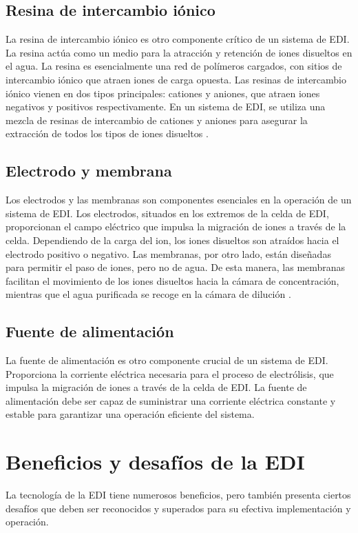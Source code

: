\subsection{Resina de intercambio iónico}
La resina de intercambio iónico es otro componente crítico de un sistema de EDI. La resina actúa como un medio para la
atracción y retención de iones disueltos en el agua. La resina es esencialmente una red de polímeros cargados, con sitios
de intercambio iónico que atraen iones de carga opuesta. Las resinas de intercambio iónico vienen en dos tipos principales:
cationes y aniones, que atraen iones negativos y positivos respectivamente. En un sistema de EDI, se utiliza una mezcla de
resinas de intercambio de cationes y aniones para asegurar la extracción de todos los tipos de iones disueltos \cite{nogueraResinasIntercambioIonico}.

\subsection{Electrodo y membrana}
Los electrodos y las membranas son componentes esenciales en la operación de un sistema de EDI. Los electrodos, situados en
los extremos de la celda de EDI, proporcionan el campo eléctrico que impulsa la migración de iones a través de la celda.
Dependiendo de la carga del ion, los iones disueltos son atraídos hacia el electrodo positivo o negativo. Las membranas,
por otro lado, están diseñadas para permitir el paso de iones, pero no de agua. De esta manera, las membranas facilitan el
movimiento de los iones disueltos hacia la cámara de concentración, mientras que el agua purificada se recoge en la cámara
de dilución \cite{lenntechElectrodeionizationEDI}.

\subsection{Fuente de alimentación}
La fuente de alimentación es otro componente crucial de un sistema de EDI. Proporciona la corriente eléctrica necesaria
para el proceso de electrólisis, que impulsa la migración de iones a través de la celda de EDI. La fuente de alimentación
debe ser capaz de suministrar una corriente eléctrica constante y estable para garantizar una operación eficiente del sistema.


\section{Beneficios y desafíos de la EDI}
La tecnología de la EDI tiene numerosos beneficios, pero también presenta ciertos desafíos que deben ser reconocidos y
superados para su efectiva implementación y operación.

